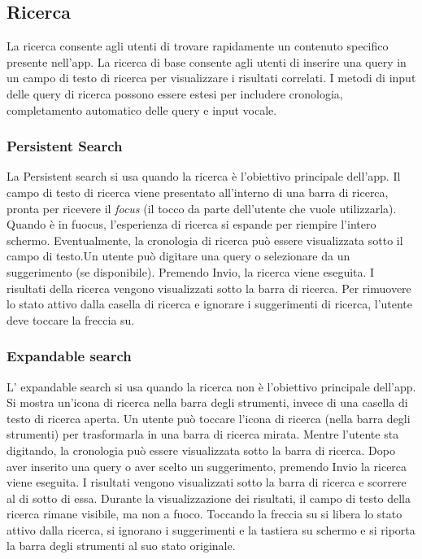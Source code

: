 \documentclass[12pt, a4paper]{report}
\begin{document}
    		\subsection{Ricerca}
    		La ricerca consente agli utenti di trovare rapidamente un contenuto specifico presente nell'app. La ricerca di base consente agli utenti di inserire una query in un campo di testo di ricerca
    		per visualizzare i risultati correlati. I metodi di input delle query di ricerca possono essere estesi per includere cronologia, completamento automatico delle query e input vocale.

    		\subsubsection{Persistent Search}
    		La Persistent search si usa quando la ricerca è l'obiettivo principale dell'app. Il campo di testo di ricerca viene presentato all'interno di una barra di ricerca, pronta per ricevere il
    		\textit{focus} (il tocco da parte dell'utente che vuole utilizzarla). Quando è in fuocus, l'esperienza di ricerca si espande per riempire l'intero schermo. Eventualmente, la cronologia di
    		ricerca può essere visualizzata sotto il campo di testo.Un utente può digitare una query o selezionare da un suggerimento (se disponibile). Premendo Invio, la ricerca viene eseguita.
    		I risultati della ricerca vengono visualizzati sotto la barra di ricerca.
            Per rimuovere lo stato attivo dalla casella di ricerca e ignorare i suggerimenti di ricerca, l'utente  deve toccare la freccia su.

    		\subsubsection{Expandable search}
    		L’ expandable search si usa quando la ricerca non è l'obiettivo principale dell’app. Si mostra un'icona di ricerca nella barra degli strumenti, invece di una casella di testo di ricerca aperta.
    		Un utente può toccare l'icona di ricerca (nella barra degli strumenti) per trasformarla in una barra di ricerca mirata. Mentre l’utente sta digitando, la cronologia può essere visualizzata
    		sotto la barra di ricerca. Dopo aver inserito una query o aver scelto un suggerimento, premendo Invio la ricerca viene eseguita. I risultati vengono visualizzati sotto la barra di ricerca e
    		scorrere al di sotto di essa. Durante la visualizzazione dei risultati, il campo di testo della ricerca rimane visibile, ma non a fuoco. Toccando la freccia su si libera lo stato attivo dalla
    		ricerca, si ignorano i suggerimenti e la tastiera su schermo e si riporta la barra degli strumenti al suo stato originale.
	
\end{document}

